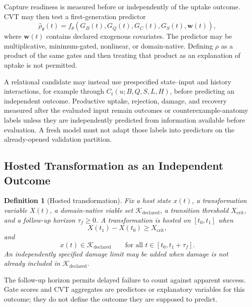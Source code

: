 \documentclass[11pt]{article}
\newtheorem{definition}{Definition}
\begin{document}
Capture readiness is measured before or independently of the uptake outcome. CVT may then test a first-generation predictor
\begin{equation}
    \widehat{\rho}_{\theta}(t)
    =
    f_{\theta}\!\left(
        G_B(t),G_Q(t),G_C(t),G_S(t),\mathbf w(t)
    \right),
    \label{eq:uptake-predictor}
\end{equation}
where \(\mathbf w(t)\) contains declared exogenous covariates. The predictor may be multiplicative, minimum-gated, nonlinear, or domain-native. Defining \(\rho\) as a product of the same gates and then treating that product as an explanation of uptake is not permitted.

A relational candidate may instead use prespecified state--input and history interactions, for example through \(C_t(u;B,Q,S,L,H)\), before predicting an independent outcome. Productive uptake, rejection, damage, and recovery measured after the evaluated input remain outcomes or counterexample-anatomy labels unless they are independently predicted from information available before evaluation. A fresh model must not adapt those labels into predictors on the already-opened validation partition.

\subsection{Hosted Transformation as an Independent Outcome}

\begin{definition}[Hosted transformation]
Fix a host state \(x(t)\), a transformation variable \(X(t)\), a domain-native viable set \(\mathcal K_{\mathrm{declared}}\), a transition threshold \(X_{\mathrm{crit}}\), and a follow-up horizon \(\tau_f\geq0\). A transformation is hosted on \([t_0,t_1]\) when
\begin{equation}
    X(t_1)-X(t_0)
    \geq
    X_{\mathrm{crit}},
    \label{eq:transformation-success}
\end{equation}
and
\begin{equation}
    x(t)\in\mathcal K_{\mathrm{declared}}
    \qquad
    \text{for all }t\in[t_0,t_1+\tau_f].
    \label{eq:delayed-host-viability}
\end{equation}
An independently specified damage limit may be added when damage is not already included in \(\mathcal K_{\mathrm{declared}}\).
\end{definition}

The follow-up horizon permits delayed failure to count against apparent success. Gate scores and CVT aggregates are predictors or explanatory variables for this outcome; they do not define the outcome they are supposed to predict.
\end{document}
